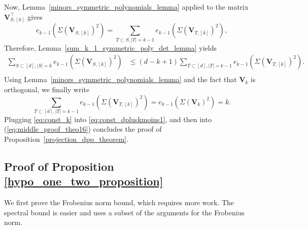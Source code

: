 \documentclass[twoside,11pt]{book}
\numberwithin{theorem}{chapter}
\numberwithin{definition}{chapter}
\numberwithin{proposition}{chapter}
\numberwithin{corollary}{chapter}
\numberwithin{example}{chapter}
\numberwithin{lemma}{chapter}
\numberwithin{assumption}{chapter}
\numberwithin{equation}{chapter}
\numberwithin{figure}{chapter}
\DeclareMathOperator{\Det}{Det}
\DeclareMathOperator{\Tran}{\intercal}
\begin{document}
Now, Lemma~\ref{minors_symmetric_polynomials_lemma} applied to the matrix $\bm{V}^{\Tran}_{S,[k]}$ gives
\begin{equation}
	e_{k-1}(\Sigma(\bm{V}_{S,[k]})^{2}) = \sum\limits_{T \subset S, |T| = k-1} e_{k-1}(\Sigma(\bm{V}_{T,[k]})^{2}),
\end{equation}
Therefore, Lemma~\ref{sum_k_1_symmetric_poly_det_lemma} yields
\begin{equation}
\label{eq:const_dpluskmoins1}
\begin{split}
\sum\limits_{S \subset [d], |S| = k} e_{k-1}(\Sigma(\bm{V}_{S,[k]})^{2})
  & \leq (d-k+1)\sum\limits_{T \subset [d], |T| = k-1} e_{k-1}(\Sigma(\bm{V}_{T,[k]})^{2}).\\
\end{split}
\end{equation}
Using Lemma~\ref{minors_symmetric_polynomials_lemma} and the fact that $\bm{V}_{k}$ is orthogonal, we finally write
\begin{equation}
\label{eq:const_k}
\sum\limits_{T \subset [d], |T| = k-1} e_{k-1}(\Sigma(\bm{V}_{T,[k]})^{2}) = e_{k-1}(\Sigma(\bm{V}_{k})^{2}) = k.
\end{equation}
Plugging \eqref{eq:const_k} into \eqref{eq:const_dpluskmoins1}, and then into (\ref{eq:middle_proof_theo16}) concludes the proof of Proposition~\ref{projection_dpp_theorem}.

\subsection{Proof of Proposition \ref{hypo_one_two_proposition}}
\label{s:proofOfExactSparsitySetting}
We first prove the Frobenius norm bound, which requires more work. The spectral bound is easier and uses a subset of the arguments for the Frobenius norm.
\end{document}
